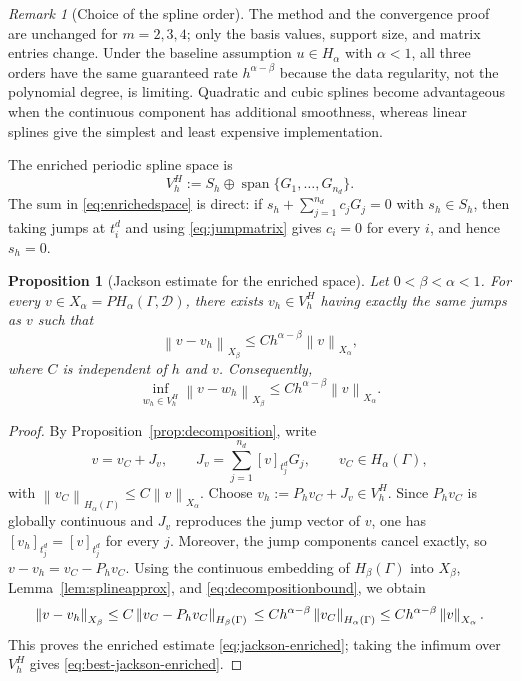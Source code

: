 \documentclass[11pt,a4paper]{amsart}
\theoremstyle{plain}
\newtheorem{proposition}[theorem]{Proposition}
\theoremstyle{definition}
\theoremstyle{remark}
\newtheorem{remark}[theorem]{Remark}
\newcommand{\Ga}{\Gamma}
\newcommand{\D}{\mathcal D}
\newcommand{\spanop}{\operatorname{span}}
\newcommand{\norm}[1]{\left\|#1\right\|}
\begin{document}
\begin{remark}[Choice of the spline order]\label{rem:splineorder}
The method and the convergence proof are unchanged for $m=2,3,4$; only the basis values, support size, and matrix entries change.  Under the baseline assumption $u\in H_\alpha$ with $\alpha<1$, all three orders have the same guaranteed rate $h^{\alpha-\beta}$ because the data regularity, not the polynomial degree, is limiting.  Quadratic and cubic splines become advantageous when the continuous component has additional smoothness, whereas linear splines give the simplest and least expensive implementation.
\end{remark}

The enriched periodic spline space is
\begin{equation}\label{eq:enrichedspace}
        V_h^H
        :=S_h\oplus\spanop\{G_1,\ldots,G_{n_d}\}.
\end{equation}
The sum in \eqref{eq:enrichedspace} is direct: if
\(
 s_h+\sum_{j=1}^{n_d}c_jG_j=0
\)
with $s_h\in S_h$, then taking jumps at $t_i^d$ and using
\eqref{eq:jumpmatrix} gives $c_i=0$ for every $i$, and hence
$s_h=0$.

\begin{proposition}[Jackson estimate for the enriched space]\label{prop:jackson-enriched}
Let $0<\beta<\alpha<1$.  For every
$v\in X_\alpha=PH_\alpha(\Ga,\D)$, there exists
$v_h\in V_h^H$ having exactly the same jumps as $v$ such that
\begin{equation}\label{eq:jackson-enriched}
        \norm{v-v_h}_{X_\beta}
        \le C h^{\alpha-\beta}\norm{v}_{X_\alpha},
\end{equation}
where $C$ is independent of $h$ and $v$.  Consequently,
\begin{equation}\label{eq:best-jackson-enriched}
        \inf_{w_h\in V_h^H}
        \norm{v-w_h}_{X_\beta}
        \le C h^{\alpha-\beta}\norm{v}_{X_\alpha}.
\end{equation}
\end{proposition}

\begin{proof}
By Proposition~\ref{prop:decomposition}, write
\[
        v=v_C+J_v,
        \qquad
        J_v=\sum_{j=1}^{n_d}[v]_{t_j^d}G_j,
        \qquad
        v_C\in H_\alpha(\Ga),
\]
with
\(
 \norm{v_C}_{H_\alpha(\Ga)}\le C\norm{v}_{X_\alpha}.
\)
Choose
$
        v_h:=P_hv_C+J_v\in V_h^H.
$
Since $P_hv_C$ is globally continuous and $J_v$ reproduces the jump
vector of $v$, one has
\(
 [v_h]_{t_j^d}=[v]_{t_j^d}
\)
for every $j$.  Moreover, the jump components cancel exactly, so
$
        v-v_h=v_C-P_hv_C.
$
Using the continuous embedding of $H_\beta(\Ga)$ into $X_\beta$,
Lemma~\ref{lem:splineapprox}, and
\eqref{eq:decompositionbound}, we obtain
\[
        \norm{v-v_h}_{X_\beta}
        \le C\norm{v_C-P_hv_C}_{H_\beta(\Ga)}\\
        \le Ch^{\alpha-\beta}\norm{v_C}_{H_\alpha(\Ga)}
        \le Ch^{\alpha-\beta}\norm{v}_{X_\alpha}.
\]
This proves the enriched estimate \eqref{eq:jackson-enriched}; taking the infimum over
$V_h^H$ gives \eqref{eq:best-jackson-enriched}.
\end{proof}
\end{document}
